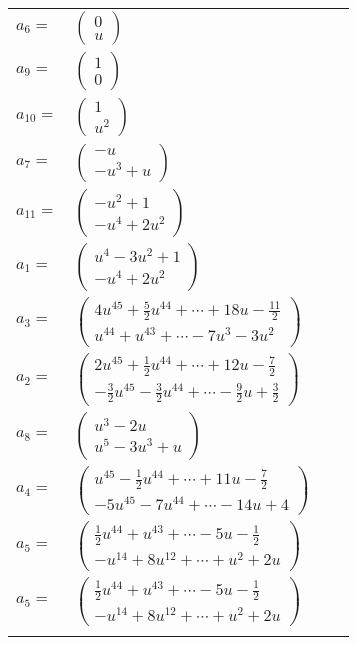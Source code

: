\documentclass[1p]{elsarticle_modified}
\theoremstyle{definition}
\begin{document}
\begin{tabular}{m{7pt} m{180pt} m{7pt} m{180pt} }
\flushright $a_{6}=$&$\begin{pmatrix}0\\u\end{pmatrix}$ \\
\flushright $a_{9}=$&$\begin{pmatrix}1\\0\end{pmatrix}$ \\
\flushright $a_{10}=$&$\begin{pmatrix}1\\u^2\end{pmatrix}$ \\
\flushright $a_{7}=$&$\begin{pmatrix}- u\\- u^3+u\end{pmatrix}$ \\
\flushright $a_{11}=$&$\begin{pmatrix}- u^2+1\\- u^4+2 u^2\end{pmatrix}$ \\
\flushright $a_{1}=$&$\begin{pmatrix}u^4-3 u^2+1\\- u^4+2 u^2\end{pmatrix}$ \\
\flushright $a_{3}=$&$\begin{pmatrix}4 u^{45}+\frac{5}{2} u^{44}+\cdots+18 u-\frac{11}{2}\\u^{44}+u^{43}+\cdots-7 u^3-3 u^2\end{pmatrix}$ \\
\flushright $a_{2}=$&$\begin{pmatrix}2 u^{45}+\frac{1}{2} u^{44}+\cdots+12 u-\frac{7}{2}\\-\frac{3}{2} u^{45}-\frac{3}{2} u^{44}+\cdots-\frac{9}{2} u+\frac{3}{2}\end{pmatrix}$ \\
\flushright $a_{8}=$&$\begin{pmatrix}u^3-2 u\\u^5-3 u^3+u\end{pmatrix}$ \\
\flushright $a_{4}=$&$\begin{pmatrix}u^{45}-\frac{1}{2} u^{44}+\cdots+11 u-\frac{7}{2}\\-5 u^{45}-7 u^{44}+\cdots-14 u+4\end{pmatrix}$ \\
\flushright $a_{5}=$&$\begin{pmatrix}\frac{1}{2} u^{44}+u^{43}+\cdots-5 u-\frac{1}{2}\\- u^{14}+8 u^{12}+\cdots+u^2+2 u\end{pmatrix}$\\ \flushright $a_{5}=$&$\begin{pmatrix}\frac{1}{2} u^{44}+u^{43}+\cdots-5 u-\frac{1}{2}\\- u^{14}+8 u^{12}+\cdots+u^2+2 u\end{pmatrix}$\\&\end{tabular}
\end{document}
